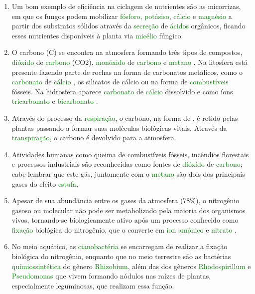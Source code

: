 \documentclass[a4paper,12pt]{article}
\begin{document}
\begin{enumerate}
\item Um bom exemplo de eficiência na ciclagem de nutrientes são as micorrizas, em que os fungos podem mobilizar \textcolor{green}{fósforo}, \textcolor{green}{potásiso}, \textcolor{green}{cálcio} e \textcolor{green}{magnésio} a partir dos substratos sólidos através da \textcolor{green}{secreção} de \textcolor{green}{ácidos} orgânicos, ficando esses nutrientes disponíveis à planta via \textcolor{green}{micélio} fúngico.
\item O carbono (C) se encontra na atmosfera formando três tipos de compostos, \textcolor{green}{dióxido} de \textcolor{green}{carbono} (CO2), \textcolor{green}{monóxido} de \textcolor{green}{carbono}  e \textcolor{green}{metano} . Na litosfera está presente fazendo parte de rochas na forma de carbonatos metálicos, como o \textcolor{green}{carbonato} de \textcolor{green}{cálcio} , os silicatos de cálcio ou na forma de \textcolor{green}{combustíveis} fósseis. Na hidrosfera aparece \textcolor{green}{carbonato} de \textcolor{green}{cálcio} dissolvido e como íons \textcolor{green}{tricarbonato}  e \textcolor{green}{bicarbonato} .
\item Através do processo da \textcolor{green}{respiração}, o carbono, na forma de , é retido pelas plantas passando a formar suas moléculas biológicas vitais. Através da \textcolor{green}{transpiração}, o carbono é devolvido para a atmosfera.
\item Atividades humanas como queima de combustíveis fósseis, incêndios florestais e processos industriais são reconhecidas como fontes de \textcolor{green}{dióxido} de \textcolor{green}{carbono}; cabe lembrar que este gás, juntamente com o \textcolor{green}{metano} são dois dos principais gases do efeito \textcolor{green}{estufa}.
\item Apesar de sua abundância entre os gases da atmosfera (78\%), o nitrogênio gasoso ou molecular não pode ser metabolizado pela maioria dos organismos vivos, tornando-se biologicamente ativo após um processo conhecido como \textcolor{green}{fixação} biológica do nitrogênio, que o converte em \textcolor{green}{íon} \textcolor{green}{amônico}  e \textcolor{green}{nitrato} .
\item No meio aquático, as \textcolor{green}{cianobactéria} se encarregam de realizar a fixação biológica do nitrogênio, enquanto que no meio terrestre são as bactérias \textcolor{green}{químiossintética} do gênero \textcolor{green}{Rhizobium}, além das dos gêneros \textcolor{green}{Rhodospirillum} e \textcolor{green}{Pseudomonas} que vivem formando nódulos nas raízes de plantas, especialmente leguminosas, que realizam essa função.

\end{enumerate}
\end{document}
